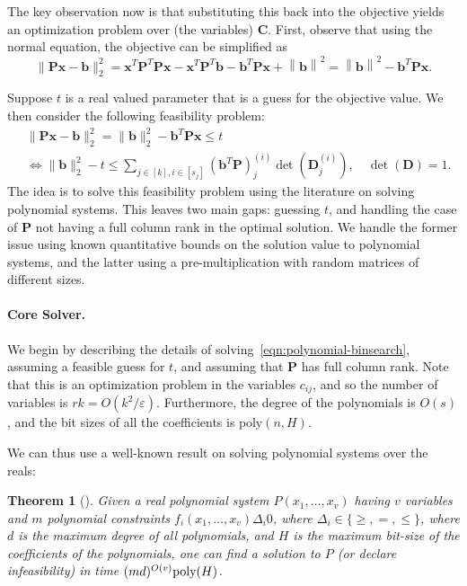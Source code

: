 \documentclass[11pt]{article}
\newcommand{\norm}[1]{\left\lVert#1\right\rVert}
\newcommand{\sumL}{\sum\limits}
\theoremstyle{plain}
\newtheorem{theorem}{Theorem}[section]
\theoremstyle{plain}
\theoremstyle{definition}
\theoremstyle{plain}
\theoremstyle{remark}
\newcommand{\eps}{\varepsilon}
\begin{document}
The key observation now is that substituting this back into the objective yields an optimization problem over (the variables) $\bm{C}$.  First, observe that using the normal equation, the objective can be simplified as
\[  \|\bm{P}\bm{x}-\bm{b}\|_2^2 = \bm{x}^T \bm{P}^T \bm{P} \bm{x} - \bm{x}^T \bm{P}^T \bm{b} - \bm{b}^T \bm{P} \bm{x} + \norm{\bm{b}}^2 = \norm{\bm{b}}^2 - \bm{b}^T \bm{P} \bm{x}. \]

Suppose $t$ is a real valued parameter that is a guess for the objective value. We then consider the following feasibility problem:
\begin{align}
    &\|\bm{P}\bm{x}-\bm{b}\|_2^2 =   \|\bm{b}\|_2^2  -\bm{b}^T\bm{P}\bm{x} \leq t \\
\label{eqn:polynomial-binsearch}    & \iff \|\bm{b}\|_2^2 -t  \leq  \sumL_{j\in [k], i\in [s_j]}(\bm{b}^T\bm{P})_j^{(i)}\det(\bm{D}_j^{(i)}) , \quad\det(\bm{D})=1. 
\end{align}
The idea is to solve this feasibility problem using the literature on solving polynomial systems. This leaves two main gaps: guessing $t$, and handling the case of $\bm{P}$ not having a full column rank in the optimal solution. We handle the former issue using known quantitative bounds on the solution value to polynomial systems, and the latter using a pre-multiplication with random matrices of different sizes.


\paragraph{Core Solver.}  We begin by describing the details of solving~\eqref{eqn:polynomial-binsearch}, assuming a feasible guess for $t$, and assuming that $\bm{P}$ has full column rank. Note that this is an optimization problem in the variables $c_{ij}$, and so the number of variables is $rk = O(k^2 / \eps)$. Furthermore, the degree of the polynomials is $O(s)$, and the bit sizes of all the coefficients is $\text{poly}(n, H)$.

We can thus use a well-known result on solving polynomial systems over the reals:
\begin{theorem}[\cite{renegar1992computationala,renegar1992computationalb,BPR96}]
\label{thm:poly_system_solving}
Given a real polynomial system $P(x_1,\dots,x_v)$ having $v$ variables and $m$ polynomial constraints $f_i(x_1,\dots,x_v) \Delta_i 0$, where $\Delta_i \in \{\geq , =, \leq \}$, where $d$ is the maximum degree of all polynomials, and $H$ is the maximum bit-size of the coefficients of the polynomials, one can find a solution to $P$ (or declare infeasibility) in time $(md)^{O(v)}\textnormal{poly}(H)$.
\end{theorem}
\end{document}
